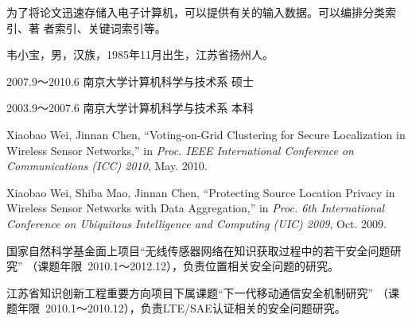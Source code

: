 \documentclass[oneside, phd]{njuthesis}
\begin{document}
为了将论文迅速存储入电子计算机，可以提供有关的输入数据。可以编排分类索引、著
者索引、关键词索引等。

\backmatter



%
%


\begin{resume}
\begin{authorinfo}
\noindent 韦小宝，男，汉族，1985年11月出生，江苏省扬州人。
\end{authorinfo}
\begin{education}
\item[2007.9～2010.6] 南京大学计算机科学与技术系 \hfill 硕士
\item[2003.9～2007.6] 南京大学计算机科学与技术系 \hfill 本科
\end{education}
\begin{publications}{2}
\item Xiaobao Wei, Jinnan Chen, ``Voting-on-Grid Clustering for Secure
  Localization in Wireless Sensor Networks,'' in \emph{Proc. IEEE International
    Conference on Communications (ICC) 2010}, May. 2010.
\item Xiaobao Wei, Shiba Mao, Jinnan Chen, ``Protecting Source Location Privacy
  in Wireless Sensor Networks with Data Aggregation,'' in \emph{Proc. 6th
    International Conference on Ubiquitous Intelligence and Computing (UIC)
    2009}, Oct. 2009.
\end{publications}
\begin{projects}
\item 国家自然科学基金面上项目``无线传感器网络在知识获取过程中的若干安全问题研究''
（课题年限~2010.1～2012.12），负责位置相关安全问题的研究。
\item 江苏省知识创新工程重要方向项目下属课题``下一代移动通信安全机制研究''
（课题年限~2010.1～2010.12），负责LTE/SAE认证相关的安全问题研究。
\end{projects}
\end{resume}
\end{document}
